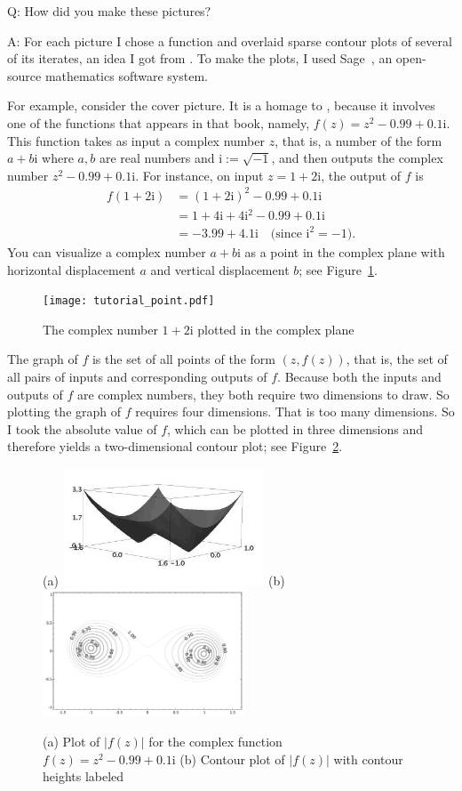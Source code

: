 \documentclass[12pt, a4paper]{amsart}
\newcommand{\mi}{\text{i}}  %
\begin{document}
Q: How did you make these pictures?

A: For each picture I chose a function and overlaid sparse contour plots of several of its iterates, an idea I got from \cite{Hamp2009}.
To make the plots, I used Sage~\cite{Sage}, an open-source mathematics software system.

For example, consider the cover picture.
It is a homage to \cite{Hamp2009}, because it involves one of the functions that appears in that book, namely, $f(z) = z^2  - 0.99 + 0.1\mi$.
This function takes as input a complex number $z$, that is, a number of the form $a + b\mi$ where $a, b$ are real numbers and $\mi := \sqrt{-1}$, and then outputs the complex number $z^2 - 0.99 + 0.1\mi$.
For instance, on input $z = 1 + 2\mi$, the output of $f$ is
\begin{align*}
    f(1 + 2\mi) 
    &= 
    (1 + 2\mi)^2 -0.99 +0.1\mi \\
    &= 
    1 + 4\mi +4\mi^2 - 0.99 + 0.1\mi \\
    &= 
    -3.99 + 4.1\mi \quad\text{(since $\mi^2 = -1$)}.
\end{align*}
You can visualize a complex number $a + b\mi$ as a point in the complex plane with horizontal displacement $a$ and vertical displacement $b$; see Figure~\ref{fig:point}.

\begin{figure}[!ht]
\texttt{[image: tutorial\_point.pdf]}
\caption{
The complex number $1 + 2\mi$ plotted in the complex plane
}
\label{fig:point}
\end{figure}

The graph of $f$ is the set of all points of the form $(z, f(z))$, that is, the set of all pairs of inputs and corresponding outputs of $f$. 
Because both the inputs and outputs of $f$ are complex numbers, they both require two dimensions to draw.
So plotting the graph of $f$ requires four dimensions.
That is too many dimensions.
So I took the absolute value of $f$, which can be plotted in three dimensions and therefore yields a two-dimensional contour plot; see Figure~\ref{fig:3d}.

\begin{figure}[!ht]
(a) \includegraphics[width=60mm]{tutorial_3d.png}\qquad
(b) \includegraphics[width=60mm]{tutorial_contour.pdf}
\caption{
(a) Plot of $|f(z)|$ for the complex function $f(z) = z^2  - 0.99 + 0.1\mi$
(b) Contour plot of $|f(z)|$ with contour heights labeled
}
\label{fig:3d}
\end{figure}
\end{document}
